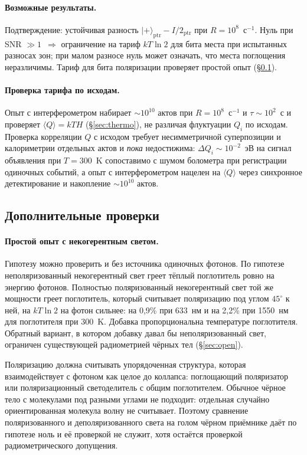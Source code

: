 \documentclass[11pt,a4paper]{article}
\newcommand{\Sref}[1]{\hyperref[#1]{\S\ref{#1}}}
\begin{document}
\paragraph{Возможные результаты.}
Подтверждение: устойчивая разность $|{+}\rangle_{\mathrm{ptr}} - I/2_{\mathrm{ptr}}$ при $R=10^{8}$~с$^{-1}$. Нуль при SNR $\gg 1$~$\Rightarrow$ ограничение на тариф $kT\ln 2$ для бита места при испытанных разносах зон; при малом разносе нуль может означать, что места поглощения неразличимы. Тариф для бита поляризации проверяет простой опыт (\Sref{sec:extra}).

\paragraph{Проверка тарифа по исходам.}
Опыт с интерферометром набирает $\sim 10^{10}$ актов при $R=10^{8}$~с$^{-1}$ и $\tau\sim 10^{2}$~с и проверяет $\langle Q\rangle = kT H$ (\Sref{sec:thermo}), не различая флуктуации $Q_i$ по исходам. Проверка корреляции $Q$ с исходом требует несимметричной суперпозиции и калориметрии отдельных актов и \emph{пока} недостижима: $\Delta Q_i \sim 10^{-2}$~эВ на сигнал объявления при $T=300$~K сопоставимо с шумом болометра при регистрации одиночных событий, а опыт с интерферометром нацелен на $\langle Q\rangle$ через синхронное детектирование и накопление $\sim 10^{10}$ актов.

\subsection{Дополнительные проверки}\label{sec:extra}

\paragraph{Простой опыт с некогерентным светом.}
Гипотезу можно проверить и без источника одиночных фотонов. По гипотезе неполяризованный некогерентный свет греет тёплый поглотитель ровно на энергию фотонов. Полностью поляризованный некогерентный свет той же мощности греет поглотитель, который считывает поляризацию под углом $45^\circ$ к ней, на $kT\ln 2$ на фотон сильнее: на 0,9\% при 633~нм и на 2,2\% при 1550~нм для поглотителя при 300~K. Добавка пропорциональна температуре поглотителя. Обратный вариант, в котором добавку давал бы неполяризованный свет, ограничен существующей радиометрией чёрных тел (\Sref{sec:open}).

Поляризацию должна считывать упорядоченная структура, которая взаимодействует с фотоном как целое до коллапса: поглощающий поляризатор или поляризационный светоделитель с общим поглотителем. Обычное чёрное тело с молекулами под разными углами не подходит: отдельная случайно ориентированная молекула волну не считывает. Поэтому сравнение поляризованного и деполяризованного света на голом чёрном приёмнике даёт по гипотезе ноль и её проверкой не служит, хотя остаётся проверкой радиометрического допущения.
\end{document}

